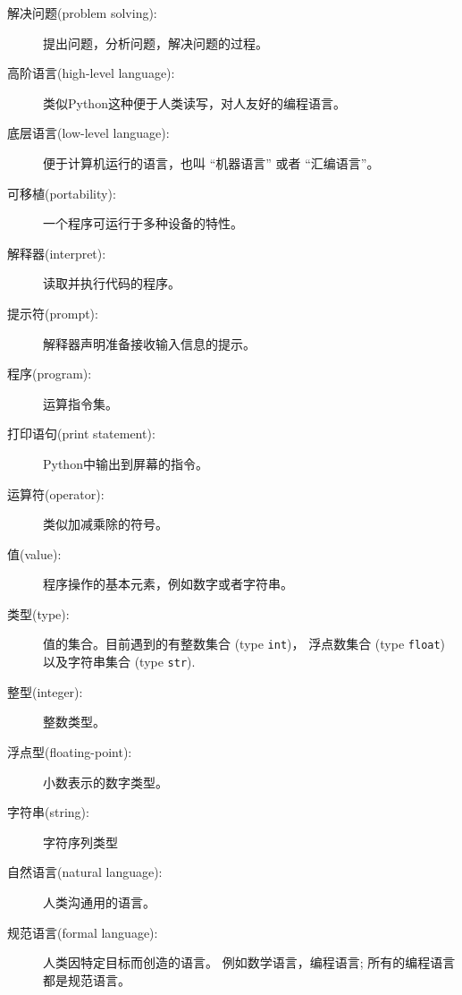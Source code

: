 \documentclass[10pt]{book}
\begin{document}
\begin{description}

\item[解决问题(problem solving):]  提出问题，分析问题，解决问题的过程。

\item[高阶语言(high-level language):]  类似Python这种便于人类读写，对人友好的编程语言。

\item[底层语言(low-level language):]  便于计算机运行的语言，也叫 “机器语言” 或者 “汇编语言”。

\item[可移植(portability):]  一个程序可运行于多种设备的特性。

\item[解释器(interpret):]  读取并执行代码的程序。

\item[提示符(prompt):] 解释器声明准备接收输入信息的提示。

\item[程序(program):] 运算指令集。

\item[打印语句(print statement):]  Python中输出到屏幕的指令。

\item[运算符(operator):]  类似加减乘除的符号。

\item[值(value):]  程序操作的基本元素，例如数字或者字符串。

\item[类型(type):] 值的集合。目前遇到的有整数集合 (type {\tt int})， 
浮点数集合 (type {\tt float})以及字符串集合 (type {\tt str}).

\item[整型(integer):] 整数类型。

\item[浮点型(floating-point):] 小数表示的数字类型。

\item[字符串(string):] 字符序列类型

\item[自然语言(natural language):]  人类沟通用的语言。

\item[规范语言(formal language):]  人类因特定目标而创造的语言。
例如数学语言，编程语言; 所有的编程语言都是规范语言。


\end{description}
\end{document}
